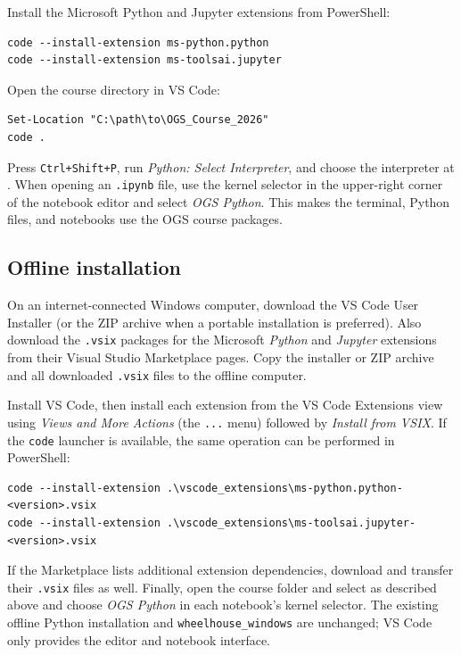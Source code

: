 \documentclass[11pt,a4paper]{tubaf-report}
\begin{document}
Install the Microsoft Python and Jupyter extensions from PowerShell:

\begin{lstlisting}[style=terminal]
code --install-extension ms-python.python
code --install-extension ms-toolsai.jupyter
\end{lstlisting}

Open the course directory in VS Code:

\begin{lstlisting}[style=terminal]
Set-Location "C:\path\to\OGS_Course_2026"
code .
\end{lstlisting}

Press \texttt{Ctrl+Shift+P}, run \emph{Python: Select Interpreter}, and choose
the interpreter at
. When opening an
\texttt{.ipynb} file, use the kernel selector in the upper-right corner of the
notebook editor and select \emph{OGS Python}. This makes
the terminal, Python files, and notebooks use the OGS course packages.

\subsection{Offline installation}

On an internet-connected Windows computer, download the VS Code User Installer
(or the ZIP archive when a portable installation is preferred). Also download
the \texttt{.vsix} packages for the Microsoft \emph{Python} and \emph{Jupyter}
extensions from their Visual Studio Marketplace pages. Copy the installer or
ZIP archive and all downloaded \texttt{.vsix} files to the offline computer.

Install VS Code, then install each extension from the VS Code Extensions view
using \emph{Views and More Actions} (the \texttt{...} menu) followed by
\emph{Install from VSIX}. If the \texttt{code} launcher is available, the same
operation can be performed in PowerShell:

\begin{lstlisting}[style=terminal]
code --install-extension .\vscode_extensions\ms-python.python-<version>.vsix
code --install-extension .\vscode_extensions\ms-toolsai.jupyter-<version>.vsix
\end{lstlisting}

If the Marketplace lists additional extension dependencies, download and
transfer their \texttt{.vsix} files as well. Finally, open the course folder and
select  as described above and choose
\emph{OGS Python} in each notebook's kernel selector. The existing offline
Python installation and \texttt{wheelhouse\_windows} are unchanged; VS Code
only provides the editor and notebook interface.
\end{document}

